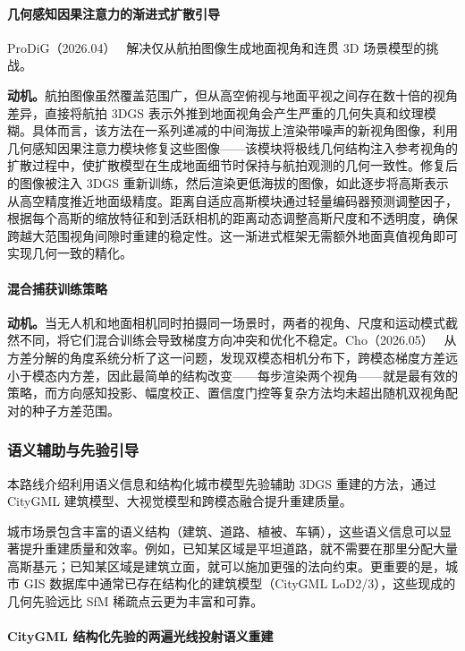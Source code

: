 \paragraph{几何感知因果注意力的渐进式扩散引导}

ProDiG（2026.04）~\cite{2604_02003} 解决仅从航拍图像生成地面视角和连贯 3D 场景模型的挑战。

\textbf{动机。}航拍图像虽然覆盖范围广，但从高空俯视与地面平视之间存在数十倍的视角差异，直接将航拍 3DGS 表示外推到地面视角会产生严重的几何失真和纹理模糊。具体而言，该方法在一系列递减的中间海拔上渲染带噪声的新视角图像，利用几何感知因果注意力模块修复这些图像——该模块将极线几何结构注入参考视角的扩散过程中，使扩散模型在生成地面细节时保持与航拍观测的几何一致性。修复后的图像被注入 3DGS 重新训练，然后渲染更低海拔的图像，如此逐步将高斯表示从高空精度推近地面级精度。距离自适应高斯模块通过轻量编码器预测调整因子，根据每个高斯的缩放特征和到活跃相机的距离动态调整高斯尺度和不透明度，确保跨越大范围视角间隙时重建的稳定性。这一渐进式框架无需额外地面真值视角即可实现几何一致的精化。

\paragraph{混合捕获训练策略}

\textbf{动机。}当无人机和地面相机同时拍摄同一场景时，两者的视角、尺度和运动模式截然不同，将它们混合训练会导致梯度方向冲突和优化不稳定。Cho（2026.05）~\cite{2605_00052} 从方差分解的角度系统分析了这一问题，发现双模态相机分布下，跨模态梯度方差远小于模态内方差，因此最简单的结构改变——每步渲染两个视角——就是最有效的策略，而方向感知投影、幅度校正、置信度门控等复杂方法均未超出随机双视角配对的种子方差范围。

\subsubsection{语义辅助与先验引导}

本路线介绍利用语义信息和结构化城市模型先验辅助 3DGS 重建的方法，通过 CityGML 建筑模型、大视觉模型和跨模态融合提升重建质量。

城市场景包含丰富的语义结构（建筑、道路、植被、车辆），这些语义信息可以显著提升重建质量和效率。例如，已知某区域是平坦道路，就不需要在那里分配大量高斯基元；已知某区域是建筑立面，就可以施加更强的法向约束。更重要的是，城市 GIS 数据库中通常已存在结构化的建筑模型（CityGML LoD2/3），这些现成的几何先验远比 SfM 稀疏点云更为丰富和可靠。

\paragraph{CityGML 结构化先验的两遍光线投射语义重建}

